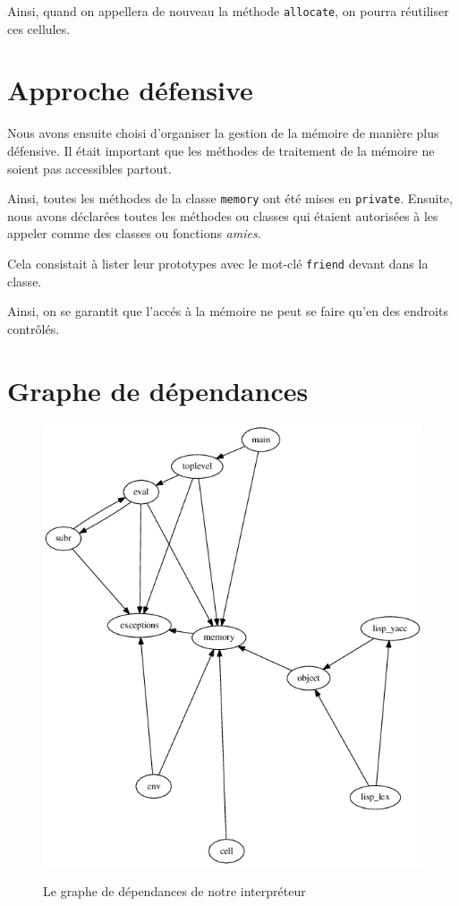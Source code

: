 \documentclass[12pt]{article}
\def\code #1{\lstinline{#1}}
\begin{document}
Ainsi, quand on appellera de nouveau la méthode \code{allocate}, on pourra réutiliser ces cellules.


\section{Approche défensive}

Nous avons ensuite choisi d'organiser la gestion de la mémoire de manière plus défensive. Il était important que les méthodes de traitement de la mémoire ne soient pas accessibles partout.

Ainsi, toutes les méthodes de la classe \code{memory} ont été mises en \code{private}. Ensuite, nous avons déclarées toutes les méthodes ou classes qui étaient autorisées à les appeler comme des classes ou fonctions \emph{amies}.

Cela consistait à lister leur prototypes avec le mot-clé \code{friend} devant dans la classe.

Ainsi, on se garantit que l'accés à la mémoire ne peut se faire qu'en des endroits contrôlés.



\section{Graphe de dépendances}

\begin{figure}
  \begin{center}
    \includegraphics[scale=0.4]{graph.png}
    \label{fig:dep}
    \caption{Le graphe de dépendances de notre interpréteur}
  \end{center}
\end{figure}
\end{document}

